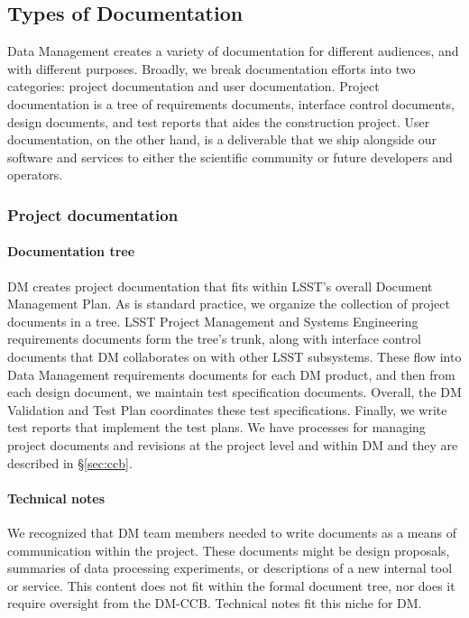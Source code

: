 \subsection{Types of Documentation}
\label{sec:doc_types}

Data Management creates a variety of documentation for different audiences, and with different purposes.
Broadly, we break documentation efforts into two categories: project documentation and user documentation.
Project documentation is a tree of requirements documents, interface control documents, design documents, and test reports that aides the construction project.
User documentation, on the other hand, is a deliverable that we ship alongside our software and services to either the scientific community or future developers and operators.

\subsubsection{Project documentation}
\label{sec:project_docs}

\paragraph{Documentation tree}

DM creates project documentation that fits within LSST's overall Document Management Plan.\cite{LPM-51}
As is standard practice, we organize the collection of project documents in a tree.
LSST Project Management and Systems Engineering requirements documents form the tree's trunk, along with interface control documents that DM collaborates on with other LSST subsystems.
These flow into Data Management requirements documents for each DM product, and then from each design document, we maintain test specification documents.
Overall, the DM Validation and Test Plan\cite{LDM-503} coordinates these test specifications.
Finally, we write test reports that implement the test plans.
We have processes for managing project documents and revisions at the project level and within DM and they are described in \S\ref{sec:ccb}.

\paragraph{Technical notes}

We recognized that DM team members needed to write documents as a means of communication within the project.
These documents might be design proposals, summaries of data processing experiments, or descriptions of a new internal tool or service.
This content does not fit within the formal document tree, nor does it require oversight from the DM-CCB.
Technical notes fit this niche for DM.

